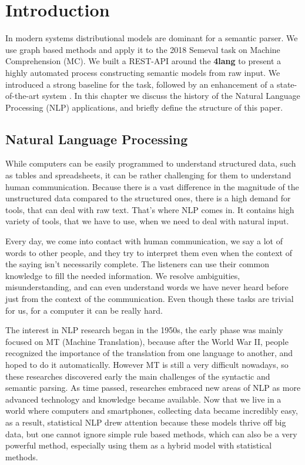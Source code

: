 \chapter{Introduction}
\label{chap:Introdu}
In modern systems distributional models are dominant for a semantic parser. We use graph based methods and apply it to the 2018 Semeval task on Machine Comprehension (MC). We built a REST-API around the \textbf{4lang}\cite{Recski:2016} to present a highly automated process constructing semantic models from raw input. We introduced a strong baseline for the task, followed by an enhancement of a state-of-the-art system \cite{Wang:2018}. In this chapter we discuss the history of the Natural Language Processing (NLP) applications, and briefly define the structure of this paper.
\section{Natural Language Processing}
While computers can be easily programmed to understand structured data, such as tables and spreadsheets, it can be rather challenging for them
to understand human communication. Because there is a vast difference in the magnitude of the unstructured data compared to the structured ones, there is a high demand
for tools, that can deal with raw text. That's where NLP comes in. It contains high variety of tools, that we have to use, when we need to deal with natural input.

Every day, we come into contact with human communication, we say a lot of words to other people, and they try to interpret them even when the context of the saying 
isn't necessarily complete. The listeners can use their common knowledge to fill the needed information. We resolve ambiguities, misunderstanding, and can even understand words 
we have never heard before just from the context of the communication.
Even though these tasks are trivial for us, for a computer it can be really hard.

The interest in NLP research began in the 1950s, the early phase was mainly focused on MT (Machine Translation), because after the World War II, people
recognized the importance of the translation from one language to another, and hoped to do it automatically.
However MT is still a very difficult nowadays, so these researches discovered early the main challenges of the syntactic and semantic parsing.
As time passed, researches embraced new areas of NLP as more advanced technology and knowledge became available. Now that we live in a world where
computers and smartphones, collecting data became incredibly easy, as a result, statistical NLP drew attention because these models thrive off big data, but one cannot ignore 
simple rule based methods, which can also be a very powerful method, especially using them as a hybrid model with statistical methods.

